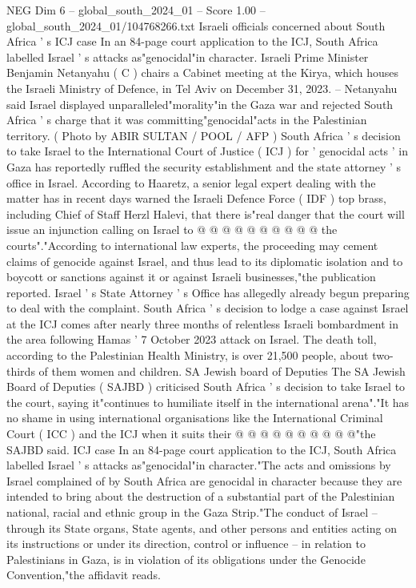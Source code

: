 \begin{textsample}{NEG Dim 6 – global\_south\_2024\_01 – Score 1.00 – global\_south\_2024\_01/104768266.txt}  \label{ex:f6_neg_351}
Israeli officials concerned about South Africa ' s ICJ case In an 84-page court application to the ICJ, South Africa labelled Israel ' s attacks as"genocidal"in character.
Israeli Prime Minister Benjamin Netanyahu ( C ) chairs a Cabinet meeting at the Kirya, which houses the Israeli Ministry of Defence, in Tel Aviv on December 31, 2023. -- Netanyahu said Israel displayed unparalleled"morality"in the Gaza war and rejected South Africa ' s charge that it was committing"genocidal"acts in the Palestinian territory. ( Photo by ABIR SULTAN / POOL / AFP ) South Africa ' s decision to take Israel to the International Court of Justice ( ICJ ) for ' genocidal acts ' in Gaza has reportedly ruffled the security establishment and the state attorney ' s office in Israel.
According to Haaretz, a senior legal expert dealing with the matter has in recent days warned the Israeli Defence Force ( IDF ) top brass, including Chief of Staff Herzl Halevi, that there is"real danger that the court will issue an injunction calling on Israel to @ @ @ @ @ @ @ @ @ @ the courts"."According to international law experts, the proceeding may cement claims of genocide against Israel, and thus lead to its diplomatic isolation and to boycott or sanctions against it or against Israeli businesses,"the publication reported.
Israel ' s State Attorney ' s Office has allegedly already begun preparing to deal with the complaint.
South Africa ' s decision to lodge a case against Israel at the ICJ comes after nearly three months of relentless Israeli bombardment in the area following Hamas ' 7 October 2023 attack on Israel.
The death toll, according to the Palestinian Health Ministry, is over 21,500 people, about two-thirds of them women and children.
SA Jewish board of Deputies The SA Jewish Board of Deputies ( SAJBD ) criticised South Africa ' s decision to take Israel to the court, saying it"continues to humiliate itself in the international arena"."It has no shame in using international organisations like the International Criminal Court ( ICC ) and the ICJ when it suits their @ @ @ @ @ @ @ @ @ @"the SAJBD said.
ICJ case In an 84-page court application to the ICJ, South Africa labelled Israel ' s attacks as"genocidal"in character."The acts and omissions by Israel complained of by South Africa are genocidal in character because they are intended to bring about the destruction of a substantial part of the Palestinian national, racial and ethnic group in the Gaza Strip."The conduct of Israel -- through its State organs, State agents, and other persons and entities acting on its instructions or under its direction, control or influence -- in relation to Palestinians in Gaza, is in violation of its obligations under the Genocide Convention,"the affidavit reads.

\end{textsample}
